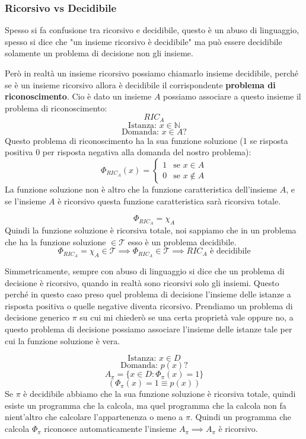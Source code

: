 \documentclass{article}
\begin{document}
\subsubsection{Ricorsivo vs Decidibile}
Spesso si fa confusione tra ricorsivo e decidibile, questo è un abuso di linguaggio,
spesso si dice che "un insieme ricorsivo è decidibile" ma può essere decidibile
solamente un problema di decisione non gli insieme.

Però in realtà un insieme ricorsivo
possiamo chiamarlo insieme decidibile, perché se è un insieme ricorsivo allora è decidibile
il corrispondente \textbf{problema di riconoscimento}. Cio è dato un insieme $A$ possiamo
associare a questo insieme il problema di riconoscimento:
$$RIC_A$$
$$\text{Istanza: }x\in\mathbb{N}$$
$$\text{Domanda: }x\in A?$$
Questo problema di riconoscimento ha la sua funzione soluzione (1 se risposta
positiva 0 per risposta negativa alla domanda del nostro problema):
\[
    \Phi_{RIC_A}(x)=
    \begin{cases}
        1 & \text{se }x\in A    \\
        0 & \text{se }x\notin A
    \end{cases}
\]
La funzione soluzione non è altro che la funzione caratteristica dell'insieme $A$,
e se l'insieme $A$ è ricorsivo questa funzione caratteristica sarà ricorsiva totale.

$$\Phi_{RIC_A}=\chi_A$$
Quindi la funzione soluzione è ricorsiva totale, noi sappiamo che in un problema
che ha la funzione soluzione $\in\mathcal{T}$ esso è un problema decidibile.
$$\Phi_{RIC_A}=\chi_A\in\mathcal{T}\implies\Phi_{RIC_A}\in\mathcal{T}\implies RIC_A\text{ è decidibile}$$

Simmetricamente, sempre con abuso di linguaggio si dice che un problema di decisione è
ricorsivo, quando in realtà sono ricorsivi solo gli insiemi. Questo perché in questo
caso preso quel problema di decisione l'insieme delle istanze a risposta positiva
o quelle negative diventa ricorsivo.
Prendiamo un problema di decisione generico $\pi$ su cui mi chiederò se una certa
proprietà vale oppure no, a questo problema di decisione possiamo associare l'insieme
delle istanze tale per cui la funzione soluzione è vera.

$$\text{Istanza: }x\in D$$
$$\text{Domanda: }p(x)?$$
$$A_\pi=\{x\in D:\Phi_\pi(x)=1\}$$
$$\left(\Phi_\pi(x)=1\equiv p(x)\right)$$
Se $\pi$ è decidibile abbiamo che la sua funzione soluzione è ricorsiva totale, quindi
esiste un programma che la calcola, ma quel programma che la calcola non fa nient'altro che
calcolare l'appartenenza o meno a $\pi$. Quindi un programma che calcola $\Phi_\pi$
riconosce automaticamente l'insieme $A_\pi\implies A_\pi$ è ricorsivo.
\end{document}
